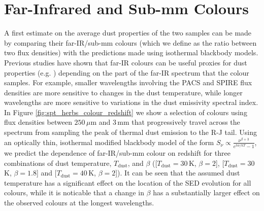 \section{Far-Infrared and Sub-mm Colours}
\label{sec:fir_submm_colours}

A first estimate on the average dust properties of the two samples can be made by comparing their far-IR/sub-mm colours (which we define as the ratio between two flux densities) with the predictions made using isothermal blackbody models. Previous studies have shown that far-IR colours can be useful proxies for dust properties (e.g. \citealt{Boselli_2010, Boselli_2012, Remy-Ruyer_2013, Smith_2019}) depending on the part of the far-IR spectrum that the colour samples. For example, smaller wavelengths involving the PACS and SPIRE flux densities are more sensitive to changes in the dust temperature, while longer wavelengths are more sensitive to variations in the dust emissivity spectral index. In Figure \ref{fig:spt_herbs_colour_redshift} we show a selection of colours using flux densities between $250\,\mu$m and $3\,$mm that progressively travel across the spectrum from sampling the peak of thermal dust emission to the R-J tail. Using an optically thin, isothermal modified blackbody model of the form $S_\nu \propto \frac{\nu^{\beta+3}}{e^{h \nu/kT} - 1}$, we predict the dependence of far-IR/sub-mm colour on redshift for three combinations of dust temperature, $T_{\textrm{dust}}$, and $\beta$ ([$T_{\textrm{dust}} = 30\,$K, $\beta = 2$], [$T_{\textrm{dust}} = 30\,$K, $\beta = 1.8$] and [$T_{\textrm{dust}} = 40\,$K, $\beta = 2$]). It can be seen that the assumed dust temperature has a significant effect on the location of the SED evolution for all colours, while it is noticable that a change in $\beta$ has a substantially larger effect on the observed colours at the longest wavelengths. 

